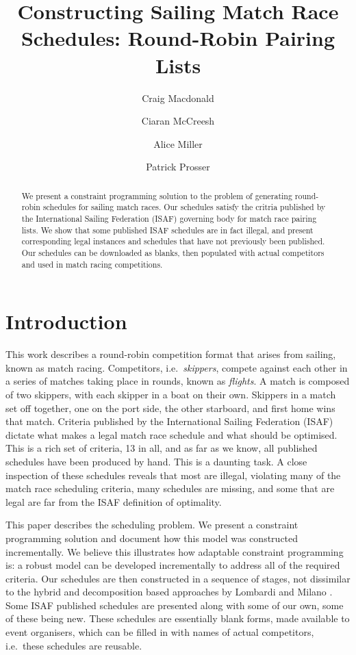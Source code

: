 \documentclass{llncs}
\begin{document}
\title{Constructing Sailing Match Race Schedules: Round-Robin Pairing Lists}
\author{Craig Macdonald \and Ciaran McCreesh \and Alice Miller \and Patrick Prosser}
\maketitle

\begin{abstract}
We present a constraint programming solution to the problem of generating round-robin schedules for sailing match races. Our schedules satisfy the critria published by the International Sailing Federation (ISAF) governing body for match race pairing lists. We show that some published ISAF schedules are in fact illegal, and present
corresponding legal instances and schedules that have not previously been published. Our schedules
can be downloaded as blanks, then populated with actual competitors and used in match racing competitions.
\end{abstract}

\section{Introduction}

This work describes a round-robin competition format that arises from sailing, known as match
racing. Competitors, i.e.\ \emph{skippers}, compete against each other in a series of matches taking
place in rounds, known as \emph{flights}.  A match is composed of two skippers, with each skipper in
a boat on their own. Skippers in a match set off together, one on the port side, the other starboard,
and first home wins that match. Criteria published by the International Sailing Federation (ISAF)
dictate what makes a legal match race schedule and what should be optimised. This is a rich set of
criteria, 13 in all, and as far as we know, all published schedules have been produced by hand. This
is a daunting task. A close inspection of these schedules reveals that most are illegal, violating
many of the match race scheduling criteria, many schedules are missing, and some that are legal are
far from the ISAF definition of optimality.

This paper describes the scheduling problem. We present a constraint programming solution and
document how this model was constructed incrementally. We believe this illustrates how adaptable
constraint programming is: a robust model can be developed incrementally to address all of the
required criteria. Our schedules are then constructed in a sequence of stages, not dissimilar to the
hybrid and decomposition based approaches by Lombardi and Milano \cite{lombardi2012}. Some ISAF
published schedules are presented along with some of our own, some of these being new.  These
schedules are essentially blank forms, made available to event organisers, which can be filled in
with names of actual competitors, i.e.\ these schedules are reusable.
\end{document}
